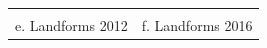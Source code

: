 \documentclass{standalone}
\begin{document}
\begin{tabular}{m{} m{}}
\\
\\
\multicolumn{1}{c}{e. Landforms 2012} & \multicolumn{1}{c}{f. Landforms 2016}\\
%
\end{tabular}

\end{document}
